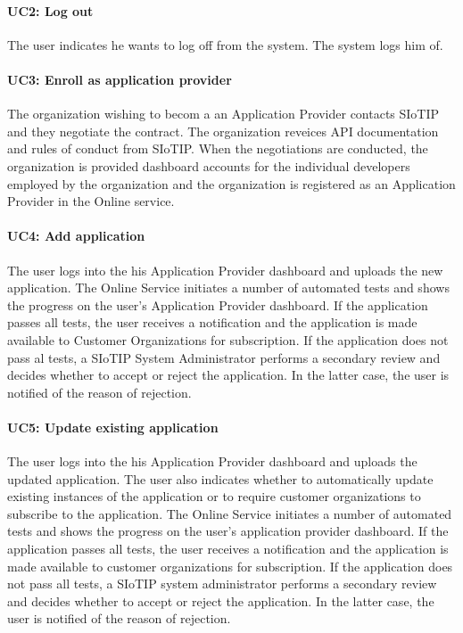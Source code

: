 \documentclass[english]{sareport}
\begin{document}
\paragraph{UC2: Log out}
The user indicates he wants to log off from the system.
The system logs him of.

\paragraph{UC3: Enroll as application provider}
The organization wishing to becom a an Application Provider contacts SIoTIP and they negotiate the contract. The organization reveices API documentation and rules of conduct from SIoTIP. When the negotiations are conducted, the organization is provided dashboard accounts for the individual developers employed by the organization and the organization is registered as an Application Provider in the Online service.

\paragraph{UC4: Add application}
The user logs into the his Application Provider dashboard and uploads the new application. The Online Service initiates a number of automated tests and shows the progress on the user's Application Provider dashboard. If the application passes all tests, the user receives a notification and the application is made available to Customer Organizations for subscription. If the application does not pass al tests, a SIoTIP System Administrator performs a secondary review and decides whether to accept or reject the application. In the latter case, the user is notified of the reason of rejection.

\paragraph{UC5: Update existing application}
The user logs into the his Application Provider dashboard and uploads the updated application. The user also indicates whether to automatically update existing instances of the application or to require customer organizations to subscribe to the application. The Online Service initiates a number of automated tests and shows the progress on the user's application provider dashboard. If the application passes all tests, the user receives a notification and the application is made available to customer organizations for subscription. If the application does not pass all tests, a SIoTIP system administrator performs a secondary review and decides whether to accept or reject the application. In the latter case, the user is notified of the reason of rejection.
\end{document}
